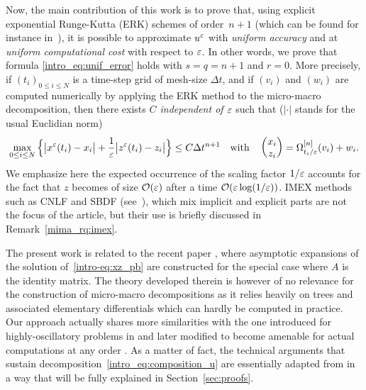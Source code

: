 Now, the main contribution of this work is to prove that, using explicit
exponential Runge-Kutta (ERK) schemes of order~$n+1$ (which can be found
for instance in~\cite{hochbruck.2005.explicit}), it is possible to approximate
$u^{\varepsilon}$ with \textit{uniform accuracy} and at \textit{uniform
computational cost} with respect to $\varepsilon$. In other words,  we prove that
formula \eqref{intro_eq:unif_error} holds with $s = q = n+1$ and $r=0$.
More precisely, if $(t_i)_{0 \leq i \leq N}$ is a  time-step grid of
mesh-size $\Delta t$, and if $(v_i)$ and $(w_i)$ are computed numerically
by applying the ERK method to the micro-macro decomposition, then there
exists \textit{$C$ independent of $\varepsilon$} such that ($| \cdot |$ stands
for the usual Euclidian norm)
\begin{equation*}
  \max_{0 \leq i \leq N} \Big\{ \big| x^{\varepsilon} (t_i) - x_i \big| 
  + \frac{1}{\varepsilon} \big| z^{\varepsilon}(t_i) - z_i \big| \Big\} 
  \leq C \Delta t^{n+1}
  \quad \text{with} \quad 
  \begin{pmatrix} x_i \\ z_i \end{pmatrix} = \Omega^{[n]}_{t_i/\varepsilon} (v_i) + w_i.
\end{equation*}
%
We emphasize here the expected occurrence of the scaling factor $1/\varepsilon$
accounts for the fact that $z$ becomes of size $\mathcal{O}(\varepsilon)$  after a
time $\mathcal{O}(\varepsilon \log(1/\varepsilon))$. IMEX methods such as CNLF and SBDF
(see~\cite{ascher.1995.implicit, akrivis.1999.implicit, hu.2021.uniform}), which
mix implicit and explicit parts are not the focus of the article, but
their use is briefly discussed in Remark~\ref{mima_rq:imex}. 


\medskip
The present work is related to the recent paper \cite{castella.2016.formal},
where asymptotic expansions of the solution of~\eqref{intro-eq:xz_pb} are
constructed for the special case where  $A$ is the identity matrix. The
theory developed therein is however of no relevance for the construction
of micro-macro decompositions as it relies heavily on trees and associated
elementary differentials which can hardly be computed in practice. Our
approach actually shares more similarities with the one introduced for
highly-oscillatory problems in \cite{chartier.2020.new} and later modified to
become amenable for actual computations at any order
\cite{chartier.2020.derivative}. As a matter of fact, the technical
arguments that sustain decomposition~\eqref{intro_eq:composition_u} are
essentially adapted from \cite{castella.2015.stroboscopic} in a way that will be fully
explained in Section~\ref{sec:proofs}. \\


